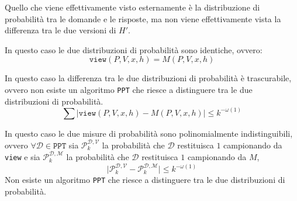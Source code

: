 Quello che viene effettivamente visto esternamente è la distribuzione di probabilità tra le domande e le risposte, ma 
non viene effettivamente vista la differenza tra le due versioni di $H'$.
\begin{tcolorbox}[title = Perfect Zero Knowledge]
    In questo caso le due distribuzioni di probabilità sono identiche, ovvero:
    \[
      \texttt{view}(P,V,x,h) = M(P,V,x,h)
    \]
\end{tcolorbox}
\begin{tcolorbox}[title = Statistical Zero Knowledge]
    In questo caso la differenza tra le due distribuzioni di probabilità è trascurabile, ovvero
    non esiste un algoritmo \texttt{PPT} che riesce a distinguere tra le due distribuzioni di probabilità.
    \[
      \sum \big| \texttt{view}(P,V,x,h) - M(P,V,x,h) \big| \leq k^{-\omega(1)}
    \]
\end{tcolorbox}
\begin{tcolorbox}[title = Computational Zero Knowledge]
    In questo caso le due misure di probabilità sono polinomialmente indistinguibili, ovvero
    $\forall \mathcal{D} \in \texttt{PPT}$ sia $\mathcal{P}_k^{\mathcal{D}, \mathcal{V}}$ la
    probabilità che $\mathcal{D}$ restituisca $1$ campionando da \texttt{view} e 
    sia $\mathcal{P}_k^{\mathcal{D}, \mathcal{M}}$ la probabilità che $\mathcal{D}$
    restituisca $1$ campionando da $M$,
    \[
        \big| \mathcal{P}_k^{\mathcal{D}, \mathcal{V}} - \mathcal{P}_k^{\mathcal{D}, \mathcal{M}} \big| \leq k^{-\omega(1)}
    \]
    Non esiste un algoritmo \texttt{PPT} che riesce a distinguere tra le due distribuzioni di probabilità.
\end{tcolorbox}
